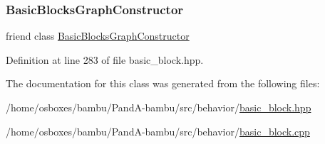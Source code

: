 \subsubsection{\texorpdfstring{Basic\+Blocks\+Graph\+Constructor}{BasicBlocksGraphConstructor}}
{\footnotesize\ttfamily friend class \hyperlink{classBasicBlocksGraphConstructor}{Basic\+Blocks\+Graph\+Constructor}\hspace{0.3cm}{\ttfamily [friend]}}



Definition at line 283 of file basic\+\_\+block.\+hpp.



The documentation for this class was generated from the following files\+:\begin{DoxyCompactItemize}
\item 
/home/osboxes/bambu/\+Pand\+A-\/bambu/src/behavior/\hyperlink{basic__block_8hpp}{basic\+\_\+block.\+hpp}\item 
/home/osboxes/bambu/\+Pand\+A-\/bambu/src/behavior/\hyperlink{basic__block_8cpp}{basic\+\_\+block.\+cpp}\end{DoxyCompactItemize}
